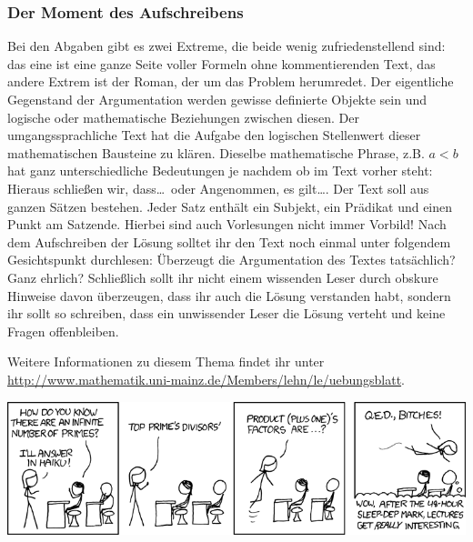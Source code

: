 \subsubsection{Der Moment des Aufschreibens}

Bei den Abgaben gibt es zwei Extreme, die beide wenig zufriedenstellend sind:
das eine ist eine ganze Seite voller Formeln ohne kommentierenden Text, das
andere Extrem ist der Roman, der um das Problem herumredet. Der eigentliche
Gegenstand der Argumentation werden gewisse definierte Objekte sein und
logische oder mathematische Beziehungen zwischen diesen. Der umgangssprachliche
Text hat die Aufgabe den logischen Stellenwert dieser mathematischen Bausteine
zu klären. Dieselbe mathematische Phrase, z.B. $a<b$ hat ganz unterschiedliche
Bedeutungen je nachdem ob im Text vorher steht: \glqq Hieraus schließen wir,
dass\dots\grqq\ oder \glqq Angenommen, es gilt\dots\grqq. Der Text soll aus
ganzen Sätzen bestehen. Jeder Satz enthält ein Subjekt, ein Prädikat und einen
Punkt am Satzende. Hierbei sind auch Vorlesungen nicht immer Vorbild! Nach dem
Aufschreiben der Lösung solltet ihr den Text noch einmal unter folgendem
Gesichtspunkt durchlesen: Überzeugt die Argumentation des Textes tatsächlich?
Ganz ehrlich? Schließlich sollt ihr nicht einem wissenden Leser durch obskure
Hinweise davon überzeugen, dass ihr auch die Lösung verstanden habt, sondern
ihr sollt so schreiben, dass ein unwissender Leser die Lösung verteht und keine
Fragen offenbleiben.

Weitere Informationen zu diesem Thema findet ihr unter
\url{http://www.mathematik.uni-mainz.de/Members/lehn/le/uebungsblatt}.

\begin{center}
\includegraphics[scale=.5]{comics/622}
\end{center}
